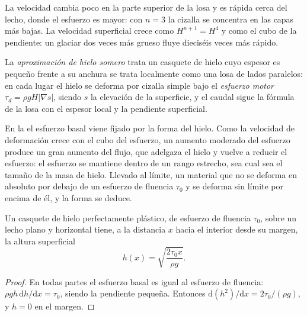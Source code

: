 La velocidad cambia poco en la parte superior de la losa y es rápida cerca del lecho,
donde el esfuerzo es mayor: con $n = 3$ la cizalla se concentra en las capas más bajas.
La velocidad superficial crece como $H^{n+1} = H^4$ y como el cubo de la pendiente:
un glaciar dos veces más grueso fluye dieciséis veces más rápido.

\begin{definition}\label{def:b3:glaciology:sia}
La \emph{aproximación de hielo somero} trata
un casquete de hielo cuyo espesor es pequeño frente a su anchura se trata localmente como
una losa de lados paralelos: en cada lugar el hielo se deforma por cizalla simple
bajo el \emph{esfuerzo motor} $\tau_d = \rho gH|\nabla s|$, siendo $s$ la
elevación de la superficie, y el caudal sigue la fórmula de la losa con el
espesor local y la pendiente superficial.
\end{definition}

En la  el esfuerzo basal viene fijado por la forma
del hielo. Como la velocidad de deformación crece con el cubo del esfuerzo, un
aumento moderado del esfuerzo produce un gran aumento del flujo, que adelgaza el
hielo y vuelve a reducir el esfuerzo: el esfuerzo se mantiene dentro de un rango
estrecho, sea cual sea el tamaño de la masa de hielo. Llevado al límite, un material
que no se deforma en absoluto por debajo de un esfuerzo de fluencia $\tau_0$ y se
deforma sin límite por encima de él, y la forma se deduce.

\begin{proposition}\label{prop:b3:glaciology:nye}
Un casquete de hielo perfectamente plástico, de esfuerzo de fluencia $\tau_0$, sobre un
lecho plano y horizontal tiene, a la distancia $x$ hacia el interior desde su margen, la altura superficial
\[
h(x) = \sqrt{\frac{2\tau_0x}{\rho g}} .
\]
\end{proposition}

\begin{proof}
En todas partes el esfuerzo basal es igual al esfuerzo de fluencia: $\rho gh\,\mathrm
dh/\mathrm dx = \tau_0$, siendo la pendiente pequeña. Entonces $\mathrm d(h^2)/\mathrm
dx = 2\tau_0/(\rho g)$, y $h = 0$ en el margen.
\end{proof}

